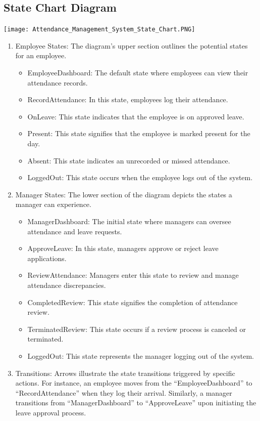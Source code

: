 \documentclass[a4paper, 12pt]{article}
\begin{document}
\subsection{State Chart Diagram}
\begin{center}
\texttt{[image: Attendance\_Management\_System\_State\_Chart.PNG]}\par
\end{center}
\begin{enumerate}
    \item Employee States: The diagram’s upper section outlines the potential states for an employee.
    \begin{itemize}
        \item EmployeeDashboard: The default state where employees can view their attendance records.
        \item RecordAttendance: In this state, employees log their attendance.
        \item OnLeave: This state indicates that the employee is on approved leave.
        \item Present: This state signifies that the employee is marked present for the day.
        \item Absent: This state indicates an unrecorded or missed attendance.
        \item LoggedOut: This state occurs when the employee logs out of the system.
    \end{itemize}
    \item Manager States: The lower section of the diagram depicts the states a manager can experience.
    \begin{itemize}
        \item ManagerDashboard: The initial state where managers can oversee attendance and leave requests.
        \item ApproveLeave: In this state, managers approve or reject leave applications.
        \item ReviewAttendance: Managers enter this state to review and manage attendance discrepancies.
        \item CompletedReview: This state signifies the completion of attendance review.
        \item TerminatedReview: This state occurs if a review process is canceled or terminated.
        \item LoggedOut: This state represents the manager logging out of the system.
    \end{itemize}
    \item Transitions: Arrows illustrate the state transitions triggered by specific actions. For instance, an employee moves from the “EmployeeDashboard” to “RecordAttendance” when they log their arrival. Similarly, a manager transitions from “ManagerDashboard” to “ApproveLeave” upon initiating the leave approval process.
\end{enumerate}
\end{document}
